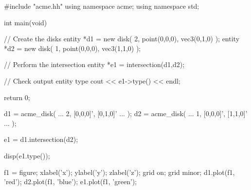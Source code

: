 \begin{minipage}[t]{0.475\textwidth}
\cpp{}
\begin{mapleboxed}
#include "acme.hh"
using namespace acme;
using namespace std;

int main(void){
  // Create the disks
  entity *d1 = new disk(
    2, point(0,0,0), vec3(0,1,0)
  );
  entity *d2 = new disk(
    1, point(0,0,0), vec3(1,1,0)
  );

  // Perform the intersection
  entity *e1 = intersection(d1,d2);

  // Check output entity type
  cout << e1->type() << endl;

  return 0;
}
\end{mapleboxed}
\end{minipage}
\hfill
\begin{minipage}[t]{0.475\textwidth}
\Matlab{}
\begin{mapleboxed}
d1 = acme_disk( ...
  2, [0,0,0]', [0,1,0]' ...
);
d2 = acme_disk( ...
  1, [0,0,0]', [1,1,0]' ...
);

e1 = d1.intersection(d2);

disp(e1.type());

f1 = figure;
xlabel('x'); ylabel('y'); zlabel('z');
grid on; grid minor;
d1.plot(f1, 'red');
d2.plot(f1, 'blue');
e1.plot(f1, 'green');
\end{mapleboxed}
\end{minipage}


